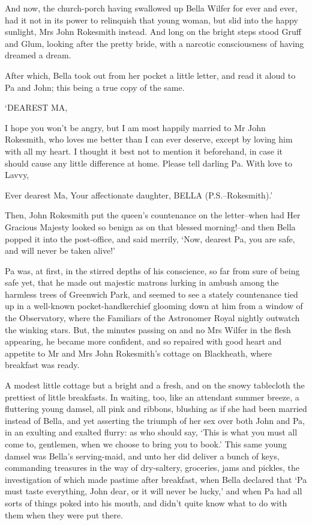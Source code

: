 And now, the church-porch having swallowed up Bella Wilfer for ever and
ever, had it not in its power to relinquish that young woman, but slid
into the happy sunlight, Mrs John Rokesmith instead. And long on the
bright steps stood Gruff and Glum, looking after the pretty bride, with
a narcotic consciousness of having dreamed a dream.

After which, Bella took out from her pocket a little letter, and read it
aloud to Pa and John; this being a true copy of the same.


‘DEAREST MA,

I hope you won’t be angry, but I am most happily married to Mr John
Rokesmith, who loves me better than I can ever deserve, except by loving
him with all my heart. I thought it best not to mention it beforehand,
in case it should cause any little difference at home. Please tell
darling Pa. With love to Lavvy,

Ever dearest Ma, Your affectionate daughter, BELLA (P.S.--Rokesmith).’


Then, John Rokesmith put the queen’s countenance on the letter--when had
Her Gracious Majesty looked so benign as on that blessed morning!--and
then Bella popped it into the post-office, and said merrily, ‘Now,
dearest Pa, you are safe, and will never be taken alive!’

Pa was, at first, in the stirred depths of his conscience, so far from
sure of being safe yet, that he made out majestic matrons lurking in
ambush among the harmless trees of Greenwich Park, and seemed to see a
stately countenance tied up in a well-known pocket-handkerchief glooming
down at him from a window of the Observatory, where the Familiars of the
Astronomer Royal nightly outwatch the winking stars. But, the minutes
passing on and no Mrs Wilfer in the flesh appearing, he became more
confident, and so repaired with good heart and appetite to Mr and Mrs
John Rokesmith’s cottage on Blackheath, where breakfast was ready.

A modest little cottage but a bright and a fresh, and on the snowy
tablecloth the prettiest of little breakfasts. In waiting, too, like
an attendant summer breeze, a fluttering young damsel, all pink and
ribbons, blushing as if she had been married instead of Bella, and yet
asserting the triumph of her sex over both John and Pa, in an exulting
and exalted flurry: as who should say, ‘This is what you must all come
to, gentlemen, when we choose to bring you to book.’ This same young
damsel was Bella’s serving-maid, and unto her did deliver a bunch of
keys, commanding treasures in the way of dry-saltery, groceries, jams
and pickles, the investigation of which made pastime after breakfast,
when Bella declared that ‘Pa must taste everything, John dear, or it
will never be lucky,’ and when Pa had all sorts of things poked into
his mouth, and didn’t quite know what to do with them when they were put
there.

